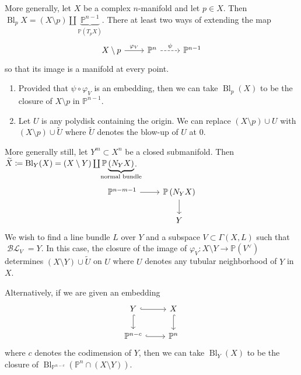 \documentclass[10pt,letterpaper,cm]{nupset}
\theoremstyle{definition}
\theoremstyle{theorem}
\theoremstyle{remark}
\renewcommand{\P}{\mathbb P}
\newcommand{\1}{\mathbb{1}}
\newcommand{\0}{\vec 0}
\DeclareMathOperator{\BL}{\mathcal{BL}}
\DeclareMathOperator{\bl}{\mathrm{Bl}}
\newcommand{\be}{\begin{enumerate}}
\newcommand{\ee}{\end{enumerate}}
\begin{document}
\medskip

More generally, let $X$ be a complex $n$-manifold and let $p\in X$. Then $\bl_p{X} = \left(X \setminus p\right) \coprod \underbrace{\P^{n-1}}_{\P\left(T_p{X}\right)}$. There at least two ways of extending the map
\[ \begin{tikzcd}
X\setminus p \arrow[r, "\varphi_V"] & \P^n \arrow[r, "\psi", dashed] & \P^{n-1}
\end{tikzcd}
\] 
so  that its image is a manifold at every point.
\be[label =(\alph*)]
\item Provided that $\psi \circ \varphi_V$ is an embedding, then we can take $\bl_p(X)$ to be the closure of $X\setminus p$ in $\P^{n-1}$. 
\item Let $U$ is any polydisk containing the origin. We can replace $\left(X \setminus p\right) \cup U$ with $\left(X\setminus p\right ) \cup \widetilde{U}$ where    $ \widetilde{U}$ denotes the blow-up of $U$ at $0$.
\ee

\medskip

More generally still, let $Y^m \subset X^n$ be a closed submanifold.  Then $\widetilde{X} \coloneqq \bl_Y(X) = \left(X \setminus Y\right) \coprod \P\underbrace{\left(N_Y{X}\right)}_{\mathclap{\text{normal bundle}}}$.
\[
\begin{tikzcd}
\P^{n-m-1} \arrow[r] & \P\left(N_Y{X}\right) \arrow[d] \\
                     & Y                              
\end{tikzcd}
\] We wish to find a line bundle $L$ over $Y$ and a subspace $V\subset \Gamma\left(X, L\right)$ such that $\BL_V = Y$. In this case, the closure of the image of $\varphi_V : X\setminus Y \to \P\left(V^{\vee}\right)$ determines $\left(X\setminus Y\right) \cup \widetilde{U}$ on $U$ where $U$ denotes any tubular neighborhood of $Y$ in $X$. 

\smallskip

Alternatively, if we are given an embedding 
\[
\begin{tikzcd}
Y \arrow[d, hook] \arrow[r, hook] & X \arrow[d, hook] \\
\P^{n-c} \arrow[r, hook]          & \P^n             
\end{tikzcd}
\] where $c$ denotes the codimension of $Y$, then we can take $\bl_Y(X)$ to be the closure of $\bl_{\P^{n-c}}\left(\P^n \cap \left(X \setminus Y\right)\right)$.
\end{document}
